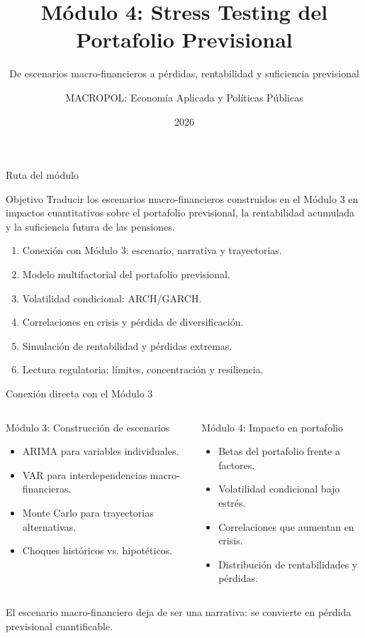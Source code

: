 \documentclass[aspectratio=169,11pt]{beamer}
\title[Stress Testing del Portafolio]{Módulo 4: Stress Testing del Portafolio Previsional}
\subtitle{De escenarios macro-financieros a pérdidas, rentabilidad y suficiencia previsional}
\author[MACROPOL]{MACROPOL: Economía Aplicada y Políticas Públicas}
\institute{Curso: Stress Testing en Sistemas de Pensiones de Capitalización Individual}
\date{2026}
\begin{document}
\begin{frame}
  \titlepage
\end{frame}

\begin{frame}{Ruta del módulo}
\begin{block}{Objetivo}
Traducir los escenarios macro-financieros construidos en el Módulo 3 en impactos cuantitativos sobre el portafolio previsional, la rentabilidad acumulada y la suficiencia futura de las pensiones.
\end{block}

\begin{enumerate}
  \item Conexión con Módulo 3: escenario, narrativa y trayectorias.
  \item Modelo multifactorial del portafolio previsional.
  \item Volatilidad condicional: ARCH/GARCH.
  \item Correlaciones en crisis y pérdida de diversificación.
  \item Simulación de rentabilidad y pérdidas extremas.
  \item Lectura regulatoria: límites, concentración y resiliencia.
\end{enumerate}
\end{frame}

\begin{frame}{Conexión directa con el Módulo 3}
\begin{columns}[T]
\begin{block}{Módulo 3: Construcción de escenarios}
\begin{itemize}
  \item ARIMA para variables individuales.
  \item VAR para interdependencias macro-financieras.
  \item Monte Carlo para trayectorias alternativas.
  \item Choques históricos vs. hipotéticos.
\end{itemize}
\end{block}

\begin{block}{Módulo 4: Impacto en portafolio}
\begin{itemize}
  \item Betas del portafolio frente a factores.
  \item Volatilidad condicional bajo estrés.
  \item Correlaciones que aumentan en crisis.
  \item Distribución de rentabilidades y pérdidas.
\end{itemize}
\end{block}
\end{columns}

\vspace{0.4cm}
\centering
\Large
\alert{El escenario macro-financiero deja de ser una narrativa: se convierte en pérdida previsional cuantificable.}
\end{frame}
\end{document}
